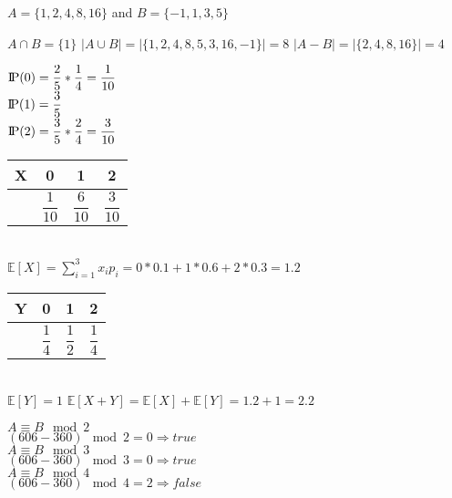 \documentclass[12pt,twoside]{article}
\newcommand{\probP}{\text{I\kern-0.15em P}}
\begin{document}

\begin{problems}

\problem  %
$A=\{1,2,4,8,16\}$ and $B=\{-1,1,3,5\}$
\begin{problemparts}
\problempart %
$A \cap B = \{1\}$
\problempart %
$\lvert A \cup B \rvert = \lvert \{1,2,4,8,5,3,16,-1\} \rvert=8$
\problempart %
$\lvert A - B \rvert = \lvert \{2,4,8,16\} \rvert=4$
\end{problemparts}

\problem  %
\begin{problemparts}
\problempart %
$ \probP(0)=\dfrac{2}{5} * \dfrac{1}{4} = \dfrac{1}{10} $ \\ [1ex]
$ \probP(1)=\dfrac{3}{5}$ \\ [1ex]
$ \probP(2)=\dfrac{3}{5}*\dfrac{2}{4}=\dfrac{3}{10}$ \\ [1ex]
\begin{tabular}{|c c c c|} 
 \hline
 X & 0 & 1 & 2 \\ [0.5ex] 
 \hline
 \probP & ${\dfrac{1}{10}}$ & ${\dfrac{6}{10}}$ & ${\dfrac{3}{10}}$ \\ [1ex]
 \hline
\end{tabular} \\

$\mathbb{E}[X]=\sum_{i=1}^{3} x_i p_i = 0*0.1 + 1*0.6 + 2*0.3 = 1.2$ \\
\problempart %
$ $ \\
\begin{tabular}{|c c c c|} 
 \hline
 Y & 0 & 1 & 2 \\ [0.5ex] 
 \hline
 \probP & ${\dfrac{1}{4}}$ & ${\dfrac{1}{2}}$ & ${\dfrac{1}{4}}$ \\ [1ex]
 \hline
\end{tabular} \\ [1em]
$\mathbb{E}[Y]=1$
\problempart %
$\mathbb{E}[X+Y]=\mathbb{E}[X]+\mathbb{E}[Y]=1.2+1=2.2$
\end{problemparts}

\problem  %

\begin{problemparts}
\problempart %
$A \equiv B \mod 2$ \\ [1em]
$(606 - 360) \mod 2 = 0 \Rightarrow true$ \\
\problempart %
$A \equiv B \mod 3$ \\ [1em]
$(606 - 360) \mod 3 = 0 \Rightarrow true$ \\
\problempart %
$A \equiv B \mod 4$ \\ [1em]
$(606 - 360) \mod 4 = 2 \Rightarrow false$ \\
\end{problemparts}


\end{problems}
\end{document}
